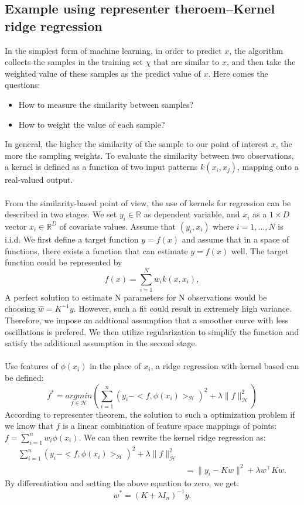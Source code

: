 \subsection{Example using representer theroem--Kernel ridge regression}
In the simplest form of machine learning, in order to predict $x$, the algorithm collects the samples in the training set $\chi$ that are similar to $x$, 
and then take the weighted value of these samples as the predict value of $x$. Here comes the questions:
\begin{itemize}
    \item How to measure the similarity between samples?
    \item How to weight the value of each sample?
\end{itemize} 
In general, the higher the similarity of the sample to our point of interest $x$, the more the sampling weights. To evaluate the similarity between two observations, 
a kernel is defined as a function of two input patterns $k(x_i, x_j)$, mapping onto a real-valued output.
\\ \\
From the similarity-based point of view, the use of kernels for regression can be described in two stages. We set $y_i \in \mathbb{R}$ as dependent variable, 
and $x_i$ as a $1 \times D$ vector $x_i \in \mathbb{R}^D$ of covariate values. Assume that $(y_i, x_i)$ where $i = 1, \dots, N$ is i.i.d. We first define a target function $y=f(x)$ and assume that in a space of functions, there exists 
a function that can estimate $y=f(x)$ well. The target function could be represented by
\begin{equation}
    f(x)= \sum_{i=1}^N w_i k(x,x_i),
\end{equation}
A perfect solution to estimate N parameters for N observations would be choosing $\hat{w}=K^{-1}y$. However, such a fit could result in extremely high variance. Therefore, we impose an addtional assumption 
that a smoother curve with less oscillations is prefered. We then utilize regularization to simplify the function and satisfy the additional assumption in 
the second stage. 
\\ \\
Use features of $\phi(x_i)$ in the place of $x_i$, a ridge regression with kernel based can be defined:
\begin{equation}
    f^*=\underset{f\in\mathcal{H}}{argmin}\left(\sum_{i=1}^n(y_i-<f,\phi(x_i)>_\mathcal{H})^2+\lambda\parallel f\parallel_\mathcal{H}^2\right)
\end{equation}
According to representer theorem, the solution to such a optimization problem if we know that $f$ is a linear combination of feature space mappings of points: $f=\sum_{i=1}^n w_i \phi(x_i)$.
We can then rewrite the kernel ridge regression as:
\begin{align}
    \sum_{i=1}^n(y_i-<f,\phi(x_i)>_\mathcal{H})^2+\lambda\parallel f\parallel_\mathcal{H}^2 \\
    &=\parallel y_i-K w\parallel^2+\lambda w^\top Kw.
\end{align}
By differentiation and setting the above equation to zero, we get:
\begin{equation}
    w^*=(K+\lambda I_n)^{-1}y.
\end{equation}
